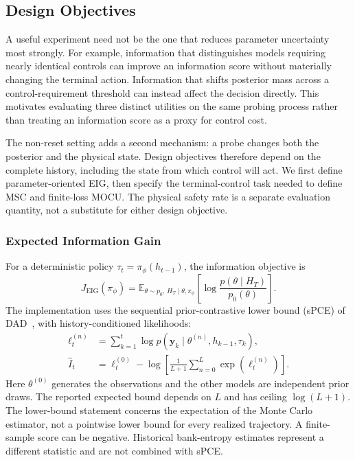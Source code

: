 \documentclass[journal]{IEEEtran}
\newcommand{\E}{\mathbb{E}}
\begin{document}
\subsection{Design Objectives}
\label{sec:objectives}
A useful experiment need not be the one that reduces parameter uncertainty
most strongly. For example, information that distinguishes models requiring
nearly identical controls can improve an information score without materially
changing the terminal action. Information that shifts posterior mass across
a control-requirement threshold can instead affect the decision directly.
This motivates evaluating three distinct utilities on the same probing
process rather than treating an information score as a proxy for control cost.

The non-reset setting adds a second mechanism: a probe changes both the
posterior and the physical state. Design objectives therefore depend on the
complete history, including the state from which control will act. We first
define parameter-oriented EIG, then specify the terminal-control task needed
to define MSC and finite-loss MOCU. The physical safety rate is a separate
evaluation quantity, not a substitute for either design objective.

\subsubsection{Expected Information Gain}
For a deterministic policy $\tau_t=\pi_\phi(h_{t-1})$, the information objective is
\begin{equation}
J_{\mathrm{EIG}}(\pi_\phi)=
\E_{\theta\sim p_0,\,H_T\mid\theta,\pi_\phi}
\left[\log\frac{p(\theta\mid H_T)}{p_0(\theta)}\right].
\label{eq:eig}
\end{equation}
The implementation uses the sequential prior-contrastive lower bound
(sPCE) of DAD~\cite{foster2021dad}, with history-conditioned likelihoods:
\begin{align}
\ell_t^{(n)}&=\sum_{k=1}^t
\log p(\mathbf y_k\mid\theta^{(n)},h_{k-1},\tau_k),\\
\widehat I_t&=\ell_t^{(0)}-
\log\left[\frac{1}{L+1}\sum_{n=0}^{L}\exp(\ell_t^{(n)})\right].
\label{eq:spce}
\end{align}
Here $\theta^{(0)}$ generates the observations and the other models are
independent prior draws. The reported expected bound depends on $L$ and
has ceiling $\log(L+1)$. The lower-bound statement concerns the expectation
of the Monte Carlo estimator, not a pointwise lower bound for every realized
trajectory. A finite-sample score can be negative. Historical bank-entropy
estimates represent a different statistic and are not combined with sPCE.
\end{document}
